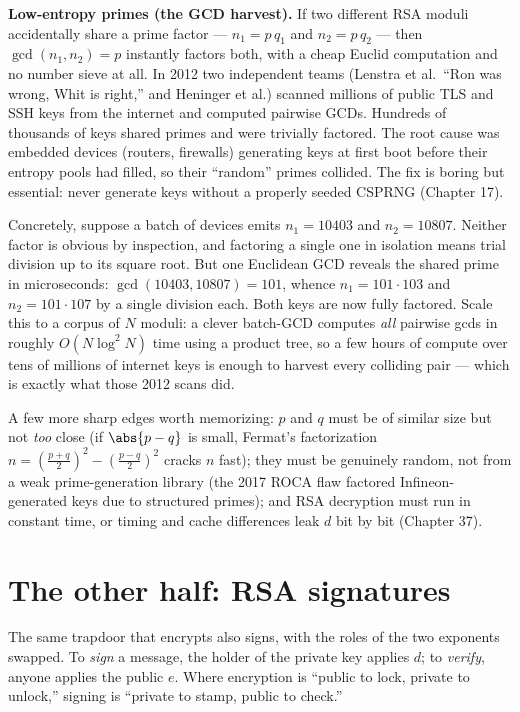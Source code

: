\begin{attackbox}
\textbf{Low-entropy primes (the GCD harvest).} If two different RSA moduli accidentally share a prime factor --- $n_1=p\,q_1$ and $n_2=p\,q_2$ --- then $\gcd(n_1,n_2)=p$ instantly factors both, with a cheap Euclid computation and no number sieve at all. In 2012 two independent teams (Lenstra et al.\ ``Ron was wrong, Whit is right,'' and Heninger et al.) scanned millions of public TLS and SSH keys from the internet and computed pairwise GCDs. Hundreds of thousands of keys shared primes and were trivially factored. The root cause was embedded devices (routers, firewalls) generating keys at first boot before their entropy pools had filled, so their ``random'' primes collided. The fix is boring but essential: never generate keys without a properly seeded CSPRNG (Chapter 17).

Concretely, suppose a batch of devices emits $n_1 = 10403$ and $n_2 = 10807$. Neither factor is obvious by inspection, and factoring a single one in isolation means trial division up to its square root. But one Euclidean GCD reveals the shared prime in microseconds: $\gcd(10403,10807)=101$, whence $n_1 = 101\cdot 103$ and $n_2 = 101\cdot 107$ by a single division each. Both keys are now fully factored. Scale this to a corpus of $N$ moduli: a clever batch-GCD computes \emph{all} pairwise gcds in roughly $O(N\log^2 N)$ time using a product tree, so a few hours of compute over tens of millions of internet keys is enough to harvest every colliding pair --- which is exactly what those 2012 scans did.
\end{attackbox}

\begin{trapbox}
A few more sharp edges worth memorizing: $p$ and $q$ must be of similar size but not \emph{too} close (if $\abs{p-q}$ is small, Fermat's factorization $n = (\tfrac{p+q}{2})^2 - (\tfrac{p-q}{2})^2$ cracks $n$ fast); they must be genuinely random, not from a weak prime-generation library (the 2017 ROCA flaw factored Infineon-generated keys due to structured primes); and RSA decryption must run in constant time, or timing and cache differences leak $d$ bit by bit (Chapter 37).
\end{trapbox}

\section{The other half: RSA signatures}
\label{ch19:signatures}

The same trapdoor that encrypts also signs, with the roles of the two exponents swapped. To \emph{sign} a message, the holder of the private key applies $d$; to \emph{verify}, anyone applies the public $e$. Where encryption is ``public to lock, private to unlock,'' signing is ``private to stamp, public to check.''

